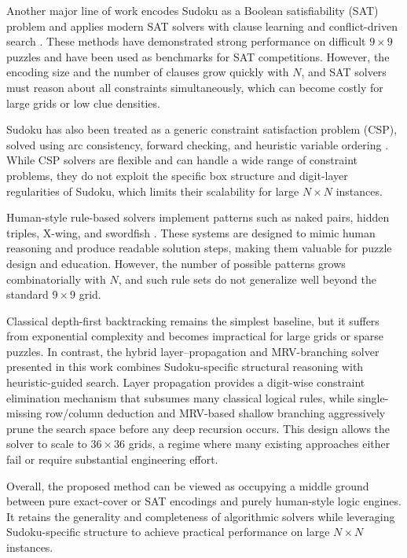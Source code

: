 \documentclass[11pt]{article}
\begin{document}
Another major line of work encodes Sudoku as a Boolean satisfiability (SAT)
problem and applies modern SAT solvers with clause learning and conflict-driven
search \cite{een2003sat,soos2010cryptominisat}. These methods have demonstrated
strong performance on difficult $9 \times 9$ puzzles and have been used as
benchmarks for SAT competitions. However, the encoding size and the number of
clauses grow quickly with $N$, and SAT solvers must reason about all constraints
simultaneously, which can become costly for large grids or low clue densities.

Sudoku has also been treated as a generic constraint satisfaction problem (CSP),
solved using arc consistency, forward checking, and heuristic variable ordering
\cite{russellnorvig}. While CSP solvers are flexible and can handle a wide range
of constraint problems, they do not exploit the specific box structure and
digit-layer regularities of Sudoku, which limits their scalability for large
$N \times N$ instances.

Human-style rule-based solvers implement patterns such as naked pairs, hidden
triples, X-wing, and swordfish \cite{berthier2007}. These systems are designed
to mimic human reasoning and produce readable solution steps, making them
valuable for puzzle design and education. However, the number of possible
patterns grows combinatorially with $N$, and such rule sets do not generalize
well beyond the standard $9 \times 9$ grid.

Classical depth-first backtracking remains the simplest baseline, but it suffers
from exponential complexity and becomes impractical for large grids or sparse
puzzles. In contrast, the hybrid layer--propagation and MRV-branching solver
presented in this work combines Sudoku-specific structural reasoning with
heuristic-guided search. Layer propagation provides a digit-wise constraint
elimination mechanism that subsumes many classical logical rules, while
single-missing row/column deduction and MRV-based shallow branching aggressively
prune the search space before any deep recursion occurs. This design allows the
solver to scale to $36 \times 36$ grids, a regime where many existing approaches
either fail or require substantial engineering effort.

Overall, the proposed method can be viewed as occupying a middle ground between
pure exact-cover or SAT encodings and purely human-style logic engines. It
retains the generality and completeness of algorithmic solvers while leveraging
Sudoku-specific structure to achieve practical performance on large $N \times N$
instances.
\end{document}
